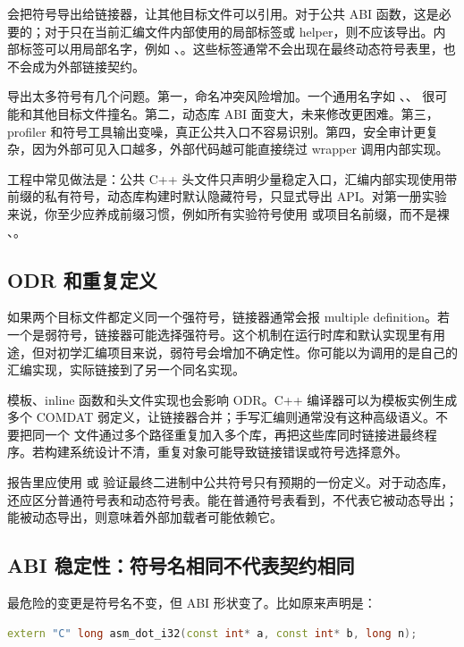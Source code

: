  会把符号导出给链接器，让其他目标文件可以引用。对于公共 ABI 函数，这是必要的；对于只在当前汇编文件内部使用的局部标签或 helper，则不应该导出。内部标签可以用局部名字，例如 、。这些标签通常不会出现在最终动态符号表里，也不会成为外部链接契约。

导出太多符号有几个问题。第一，命名冲突风险增加。一个通用名字如 、、 很可能和其他目标文件撞名。第二，动态库 ABI 面变大，未来修改更困难。第三，profiler 和符号工具输出变噪，真正公共入口不容易识别。第四，安全审计更复杂，因为外部可见入口越多，外部代码越可能直接绕过 wrapper 调用内部实现。

工程中常见做法是：公共 C++ 头文件只声明少量稳定入口，汇编内部实现使用带前缀的私有符号，动态库构建时默认隐藏符号，只显式导出 API。对第一册实验来说，你至少应养成前缀习惯，例如所有实验符号使用  或项目名前缀，而不是裸 、。

\subsection{ODR 和重复定义}

如果两个目标文件都定义同一个强符号，链接器通常会报 multiple definition。若一个是弱符号，链接器可能选择强符号。这个机制在运行时库和默认实现里有用途，但对初学汇编项目来说，弱符号会增加不确定性。你可能以为调用的是自己的汇编实现，实际链接到了另一个同名实现。

模板、inline 函数和头文件实现也会影响 ODR。C++ 编译器可以为模板实例生成多个 COMDAT 弱定义，让链接器合并；手写汇编则通常没有这种高级语义。不要把同一个  文件通过多个路径重复加入多个库，再把这些库同时链接进最终程序。若构建系统设计不清，重复对象可能导致链接错误或符号选择意外。

报告里应使用  或  验证最终二进制中公共符号只有预期的一份定义。对于动态库，还应区分普通符号表和动态符号表。能在普通符号表看到，不代表它被动态导出；能被动态导出，则意味着外部加载者可能依赖它。

\subsection{ABI 稳定性：符号名相同不代表契约相同}

最危险的变更是符号名不变，但 ABI 形状变了。比如原来声明是：

\begin{lstlisting}[language=C++]
extern "C" long asm_dot_i32(const int* a, const int* b, long n);
\end{lstlisting}

